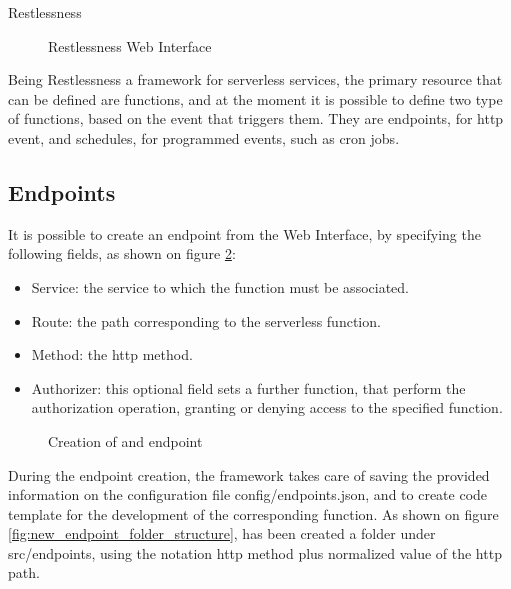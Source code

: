 \begin{chapter}{Restlessness}
    \begin{figure}
        \centering
        \caption{Restlessness Web Interface}
        \label{fig:rln_web_interface}
    \end{figure}

    Being Restlessness a framework for serverless services, the primary resource that
    can be defined are functions, and at the moment it is possible to define two type
    of functions, based on the event that triggers them. They are endpoints, for http
    event, and schedules, for programmed events, such as cron jobs.

    \subsection{Endpoints}
    \label{subsec:endpoints}
    It is possible to create an endpoint from the Web Interface, by specifying the
    following fields, as shown on figure \ref{fig:wi_create_endpoint}:
    \begin{itemize}
        \item Service: the service to which the function must be associated.
        \item Route: the path corresponding to the serverless function.
        \item Method: the http method.
        \item Authorizer: this optional field sets a further function, that
            perform the authorization operation, granting or denying access to
            the specified function. %
    \end{itemize}

    \begin{figure}
        \centering
        \caption{Creation of and endpoint}
        \label{fig:wi_create_endpoint}
    \end{figure}

    During the endpoint creation, the framework takes care of saving the provided
    information on the configuration file config/endpoints.json, and to create code
    template for the development of the corresponding function.
    As shown on figure \ref{fig:new_endpoint_folder_structure}, has been created a
    folder under src/endpoints, using the notation http method plus normalized value
    of the http path.


\end{chapter}
